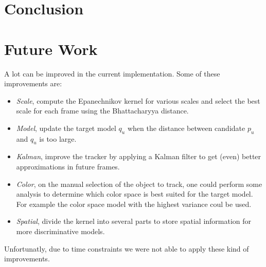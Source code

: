 \documentclass[11pt]{article}
\begin{document}
\section{Conclusion}


\section{Future Work}
A lot can be improved in the current implementation. Some of these improvements
are:
\begin{itemize}
\item{\emph{Scale}, compute the Epanechnikov kernel for various scales and
select the best scale for each frame using the Bhattacharyya distance.}
\item{\emph{Model}, update the target model $q_u$ when the distance between
candidate $p_u$ and $q_u$ is too large.}
\item{\emph{Kalman}, improve the tracker by applying a Kalman filter to get
(even) better approximations in future frames.}
\item{\emph{Color}, on the manual selection of the object to track, one could
perform some analysis to determine which color space is best suited for the
target model. For example the color space model with the highest variance coul
be used.}
\item{\emph{Spatial}, divide the kernel into several parts to store spatial
information for more discriminative models.}
\end{itemize}
Unfortunatly, due to time constraints we were not able to apply these kind of
improvements.

\renewcommand\bibname{References}


\end{document}
